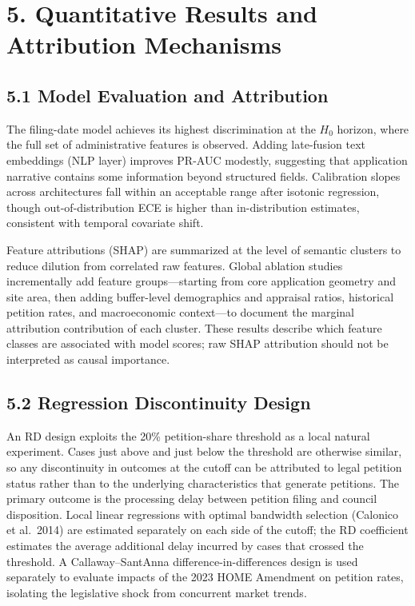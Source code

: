 \section*{5. Quantitative Results and Attribution Mechanisms}

\subsection*{5.1 Model Evaluation and Attribution}
The filing-date model achieves its highest discrimination at the $H_0$ horizon, where the full set of administrative features is observed. Adding late-fusion text embeddings (NLP layer) improves PR-AUC modestly, suggesting that application narrative contains some information beyond structured fields. Calibration slopes across architectures fall within an acceptable range after isotonic regression, though out-of-distribution ECE is higher than in-distribution estimates, consistent with temporal covariate shift.

Feature attributions (SHAP) are summarized at the level of semantic clusters to reduce dilution from correlated raw features. Global ablation studies incrementally add feature groups---starting from core application geometry and site area, then adding buffer-level demographics and appraisal ratios, historical petition rates, and macroeconomic context---to document the marginal attribution contribution of each cluster. These results describe which feature classes are associated with model scores; raw SHAP attribution should not be interpreted as causal importance. 

\subsection*{5.2 Regression Discontinuity Design}
An RD design exploits the 20\% petition-share threshold as a local natural experiment. Cases just above and just below the threshold are otherwise similar, so any discontinuity in outcomes at the cutoff can be attributed to legal petition status rather than to the underlying characteristics that generate petitions. The primary outcome is the processing delay between petition filing and council disposition. Local linear regressions with optimal bandwidth selection (Calonico et al.\ 2014) are estimated separately on each side of the cutoff; the RD coefficient estimates the average additional delay incurred by cases that crossed the threshold. A Callaway--Sant\textquotesingle Anna difference-in-differences design is used separately to evaluate impacts of the 2023 HOME Amendment on petition rates, isolating the legislative shock from concurrent market trends.

